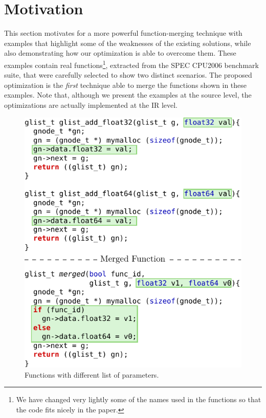 \section{Motivation} \label{sec:motivation}

This section motivates for a more powerful function-merging technique with
examples that highlight some of the weaknesses of the existing solutions, while
also demonstrating how our optimization is able to overcome them.
These examples contain real functions\footnote{We have changed very lightly some
of the names used in the functions so that the code fits nicely in the paper.},
extracted from the SPEC CPU2006 benchmark suite, that were carefully selected to
show two distinct scenarios.
The proposed optimization is the \textit{first} technique able to merge the
functions shown in these examples.
Note that, although we present the examples at the source level, the
optimizations are actually implemented at the IR level.

\begin{figure}[th]
  \centering
  \includegraphics[width=.95\linewidth]{figs/sphinx-example.pdf}
  \caption{Functions with different list of parameters.}
  \label{fig:sphinx-example}
\end{figure}


